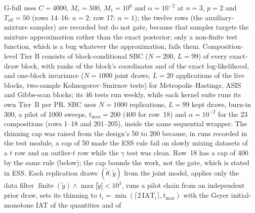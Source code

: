 G-full uses $C = 4000$, $M_c = 500$, $M_1 = 10^6$ and $\alpha = 10^{-2}$ at $n = 3$, $p = 2$ and
$T_{\mathrm{eff}} = 50$ (rows 14--16: $n = 2$; row 17: $n = 1$); the twelve  rows
(the auxiliary-mixture sampler) are recorded but do not gate, because that sampler targets the
mixture approximation rather than the exact posterior; only a non-finite test function, which is a
bug whatever the approximation, fails them.
Composition-level Tier B consists of block-conditional SBC ($N = 200$, $L = 99$) of every exact-draw
block, with ranks of the block's coordinates and of the exact log-likelihood, and one-block invariance
($N = 1000$ joint draws, $L = 20$ applications of the live blocks, two-sample Kolmogorov--Smirnov tests)
for Metropolis--Hastings, ASIS and Gibbs-scan blocks; its 46 tests run weekly, while each kernel
suite runs its own Tier~B per PR.
SBC uses $N = 1000$ replications, $L = 99$ kept draws, burn-in 300, a pilot of 1000 sweeps,
$t_{\max} = 200$ (400 for row~18) and $\alpha = 10^{-2}$ for the 23 compositions (rows 1--18 and
201--205), inside the same sequential wrapper.
The thinning cap was raised from the design's 50 to 200 because, in runs recorded in the test
module, a cap of 50 made the ESS rule fail on slowly mixing datasets of a $t$ row and an
outlier-$t$ row while the $\gamma$ test was clean. %
Row~18 has a cap of 400 by the same rule (below); the cap bounds the work, not the gate,
which is stated in ESS. %
Each replication draws $(\tilde\theta, \tilde y)$ from the joint model, applies only the data filter
$\operatorname{finite}(\tilde y) \wedge \max|\tilde y| < 10^3$, runs a pilot chain from an
independent prior draw, sets its thinning to $t_i = \min(\lceil 2\,\mathrm{IAT}_i\rceil,
t_{\max})$ with the Geyer initial-monotone IAT \citep{geyer1992practical} of the quantities and of
